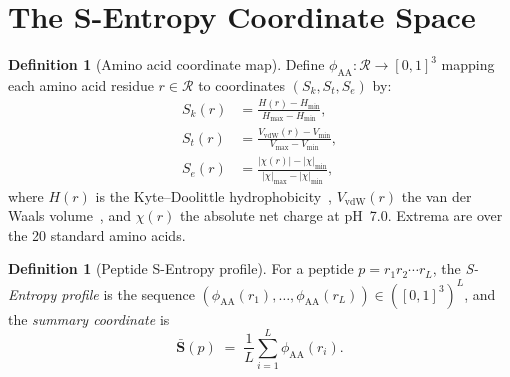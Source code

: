 \documentclass[11pt,a4paper]{article}
\theoremstyle{definition}
\newtheorem{definition}[theorem]{Definition}
\theoremstyle{remark}
\newcommand{\Sk}{S_k}
\newcommand{\St}{S_t}
\newcommand{\Se}{S_e}
\newcommand{\Scoord}{\mathbf{S}}
\begin{document}
\section{The S-Entropy Coordinate Space}
\label{sec:sentropy}

\begin{definition}[Amino acid coordinate map]
\label{def:sentropy}
Define $\phi_{\mathrm{AA}}:\mathcal{R}\to[0,1]^3$ mapping each amino
acid residue $r\in\mathcal{R}$ to coordinates $(\Sk,\St,\Se)$ by:
\begin{align}
  \Sk(r) &= \frac{H(r)-H_{\min}}{H_{\max}-H_{\min}}, \label{eq:sk}\\[4pt]
  \St(r) &= \frac{V_{\mathrm{vdW}}(r)-V_{\min}}{V_{\max}-V_{\min}},
  \label{eq:st}\\[4pt]
  \Se(r) &= \frac{|\chi(r)|-|\chi|_{\min}}{|\chi|_{\max}-|\chi|_{\min}},
  \label{eq:se}
\end{align}
where $H(r)$ is the Kyte--Doolittle
hydrophobicity~\citep{kyte1982simple}, $V_{\mathrm{vdW}}(r)$ the van
der Waals volume~\citep{zamyatnin1972protein}, and $\chi(r)$ the
absolute net charge at pH~7.0. Extrema are over the 20 standard amino
acids.
\end{definition}

\begin{definition}[Peptide S-Entropy profile]
\label{def:profile}
For a peptide $p=r_1 r_2\cdots r_L$, the \emph{S-Entropy profile} is
the sequence $(\phi_{\mathrm{AA}}(r_1),\dots,\phi_{\mathrm{AA}}(r_L))
\in([0,1]^3)^L$, and the \emph{summary coordinate} is
\[
  \bar{\Scoord}(p)
  \;=\;
  \frac{1}{L}\sum_{i=1}^{L}\phi_{\mathrm{AA}}(r_i).
\]
\end{definition}
\end{document}
